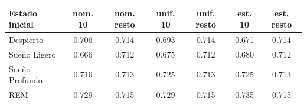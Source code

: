 \begin{tabular}{lcccccc}
\toprule
\textbf{Estado inicial} & \textbf{nom. 10} & \textbf{nom. resto} & \textbf{unif. 10} & \textbf{unif. resto} & \textbf{est. 10} & \textbf{est. resto} \\
\midrule
Despierto & 0.706 & 0.714 & 0.693 & 0.714 & 0.671 & 0.714 \\
Sueño Ligero & 0.666 & 0.712 & 0.675 & 0.712 & 0.680 & 0.712 \\
Sueño Profundo & 0.716 & 0.713 & 0.725 & 0.713 & 0.725 & 0.713 \\
REM & 0.729 & 0.715 & 0.729 & 0.715 & 0.735 & 0.715 \\
\bottomrule
\end{tabular}
